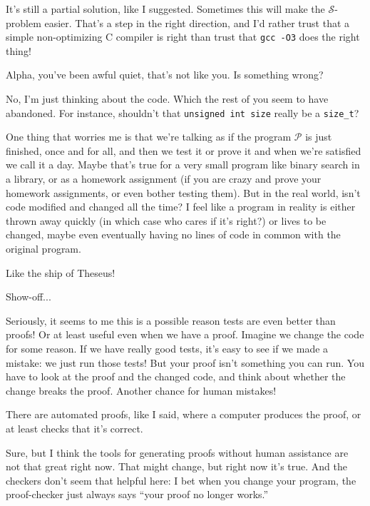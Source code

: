 \documentclass[sigplan]{acmart}
\begin{document}
   It's still a partial solution, like I
suggested. Sometimes this will make the $\mathcal{S}$-problem easier.
That's a step in the right direction, and I'd rather trust that a
simple non-optimizing C compiler is right than trust that {\tt gcc
  -O3} does the right thing!

  Alpha, you've been awful quiet, that's not
like you. Is something wrong?

  No, I'm just thinking about the code.
Which the rest of you seem to have abandoned.  For instance, shouldn't
that {\tt unsigned int size} really be a {\tt size\_t}?

  One thing that worries me is that we're
talking as if the program  $\mathcal{P}$ is just finished, once and
for all, and then we test it or prove it and when we're satisfied we
call it a day.  Maybe that's true for a very small program like binary
search in a library, or as a homework assignment (if you are crazy and
prove your homework assignments, or even bother testing them).  But in
the real world, isn't code modified and changed all the time?  I feel
like a program in reality is either thrown away quickly (in which case
who cares if it's right?) or lives to be changed, maybe even
eventually having no lines of code in common with the original program.

  Like the ship of Theseus!

 Show-off... 

  Seriously, it seems to me this is a possible reason
tests are even better than proofs!  Or at least useful even when we have a proof.
Imagine we change the code for some reason.  If we have really good tests, it's
easy to see if we made a mistake: we just run those tests!  But your
proof isn't something you can run.   You have to look at the proof and
the changed code, and think about whether the change breaks the
proof.  Another chance for human mistakes!

 There are automated proofs, like I said,
where a
computer produces the proof, or at least checks that it's correct.

 Sure, but I think the tools for generating
proofs without human assistance are not that great right now.  That
might change, but right now it's true.  And the checkers don't seem
that helpful here:  I bet when you change your program, the
proof-checker just always says ``your proof no longer works.''
\end{document}
